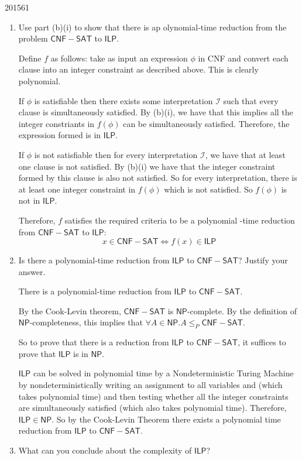 \documentclass[10pt,\jkfside,a4paper]{article}
\begin{document}
\begin{examquestion}{2015}{6}{1}
\begin{enumerate}[label=(\alph*)]
\begin{enumerate}[label=(\roman*)]
\item Use part (b)(i) to show that there is ap olynomial-time reduction from
the problem $\mathsf{CNF-SAT}$ to $\mathsf{ILP}$.

Define $f$ as follows: take as input an expression $\phi$ in CNF and convert
each clause into an integer constraint as described above. This is clearly
polynomial.

If $\phi$ is satisfiable then there exists some interpretation $\mathcal I$
such that every clause is simultaneously satisfied. By (b)(i), we have that
this implies all the integer constriants in $f(\phi)$ can be simultaneously
satisfied. Therefore, the expression formed is in $\mathsf{ILP}$.

If $\phi$ is not satisfiable then for every interpretation $\mathcal I$, we
have that at least one clause is not satisfied. By (b)(i) we have that the
integer constraint formed by this clause is also not satisfied. So for every
interpretation, there is at least one integer constraint in $f(\phi)$
which is not satisfied. So $f(\phi)$ is not in $\mathsf{ILP}$.

Therefore, $f$ satisfies the required criteria to be a polynomial
-time reduction from $\mathsf{CNF-SAT}$ to $\mathsf{ILP}$:
\[
x \in \mathsf{CNF-SAT} \iff f(x) \in \mathsf{ILP}
\]

\item Is there a polynomial-time reduction from $\mathsf{ILP}$ to
$\mathsf{CNF-SAT}$? Justify your answer.

There is a polynomial-time reduction from $\mathsf{ILP}$ to $\mathsf{CNF-SAT}$.

By the Cook-Levin theorem, $\mathsf{CNF-SAT}$ is $\mathsf{NP}$-complete. By
the definition of $\mathsf{NP}$-completeness, this implies that
$\forall A \in \mathsf{NP}. A \le_P \mathsf{CNF-SAT}$.

So to prove that there is a reduction from $\mathsf{ILP}$ to
$\mathsf{CNF-SAT}$, it suffices to prove that $\mathsf{ILP}$ is in
$\mathsf{NP}$.

$\mathsf{ILP}$ can be solved in polynomial time by a Nondeterministic Turing
Machine by nondeterministically writing an assignment to all variables and
(which takes polynomial time) and then testing whether all the integer
constraints are simultaneously satisfied (which also takes polynomial time).
Therefore, $\mathsf{ILP} \in \mathsf{NP}$. So by the Cook-Levin Theorem
there exists a polynomial time reduction from $\mathsf{ILP}$ to
$\mathsf{CNF-SAT}$.

\item What can you conclude about the complexity of $\mathsf{ILP}$?


\end{enumerate}
\end{enumerate}
\end{examquestion}
\end{document}
